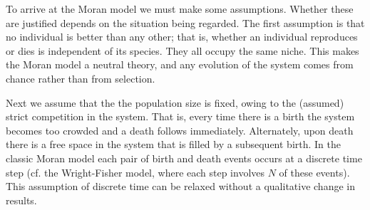 \iffalse
As a reminder, the Moran model \cite{Moran1962} is a classic urn model used in population dynamics in a variety of ways.
Its most prominent uses are in coalescent theory \cite{Kingman1982,Blythe2007,Etheridge2010} and neutral theory \cite{Kimura1956,Bell2000,Hubbell2001}, describing how the relative proportion of genes in a gene pool might change over time. 
In fact it can describe any system where individuals of different species/strains undergo strong but unselective competition in some closed or finite ecosystem \cite{Claussen2005}: applications include cancer progression \cite{Ashcroft2015}, evolutionary game theory \cite{Tayloer2004,Antal2006,Hilbe2011}, competition between species \cite{Houchmandzadeh2011,Blythe2011,Constable2015}, population dynamics with evolution \cite{Traulsen2006}, and linguistics \cite{Blythe2007}. 
\fi

\iffalse
To arrive at the Moran model we must make some assumptions.
Whether these are justified depends on the situation being regarded.
The first assumption is that no individual is better than any other; that is, whether an individual reproduces or dies is independent of its species. %
They all occupy the same niche. 
This makes the Moran model a neutral theory, and any evolution of the system comes from chance rather than from selection. 

Next we assume that the the population size is fixed, owing to the (assumed) strict competition in the system.
That is, every time there is a birth the system becomes too crowded and a death follows immediately. Alternately, upon death there is a free space in the system that is filled by a subsequent birth.
In the classic Moran model each pair of birth and death events occurs at a discrete time step (cf. the Wright-Fisher model, where each step involves $N$ of these events). %
This assumption of discrete time can be relaxed without a qualitative change in results. 


